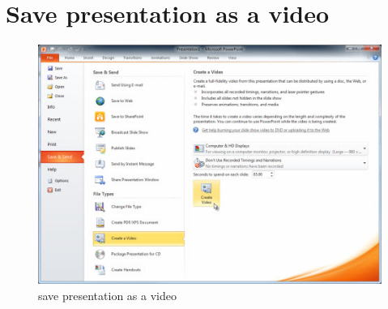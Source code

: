 \documentclass[10pt,a4paper]{article}
\begin{document}
\section{Save presentation as a video}
\begin{figure}[h]
\centering
\includegraphics[scale=0.5]{ppt_presentation_2_video}
\caption{save presentation as a video}
\label{fig:ppt_presentation_2_video}
\end{figure}
\end{document}
